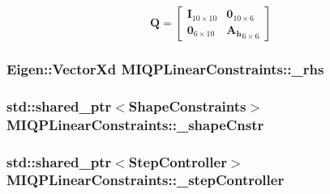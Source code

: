 \[ \mathbf{Q} = \left[\begin{array}{cc} \mathbf{I}_{10\times10} & \mathbf{0}_{10\times6}\\ \mathbf{0}_{6\times10} & \mathbf{A_h}_{6\times6} \end{array}\right] \] \hypertarget{classMIQPLinearConstraints_ac8df74075c393100f5bddcb371503530}{
\subsubsection[{\-\_\-rhs}]{\setlength{\rightskip}{0pt plus 5cm}\-Eigen\-::\-Vector\-Xd {\bf \-M\-I\-Q\-P\-Linear\-Constraints\-::\-\_\-rhs}}}\label{classMIQPLinearConstraints_ac8df74075c393100f5bddcb371503530}
\hypertarget{classMIQPLinearConstraints_a5c8788e52f7b0664606662cfa758ae88}{
\subsubsection[{\-\_\-shape\-Cnstr}]{\setlength{\rightskip}{0pt plus 5cm}std\-::shared\-\_\-ptr$<${\bf \-Shape\-Constraints}$>$ {\bf \-M\-I\-Q\-P\-Linear\-Constraints\-::\-\_\-shape\-Cnstr}}}\label{classMIQPLinearConstraints_a5c8788e52f7b0664606662cfa758ae88}
\hypertarget{classMIQPLinearConstraints_ac1ea7dbfb54c84c9c3e172d36aa42671}{
\subsubsection[{\-\_\-step\-Controller}]{\setlength{\rightskip}{0pt plus 5cm}std\-::shared\-\_\-ptr$<${\bf \-Step\-Controller}$>$ {\bf \-M\-I\-Q\-P\-Linear\-Constraints\-::\-\_\-step\-Controller}}}\label{classMIQPLinearConstraints_ac1ea7dbfb54c84c9c3e172d36aa42671}
